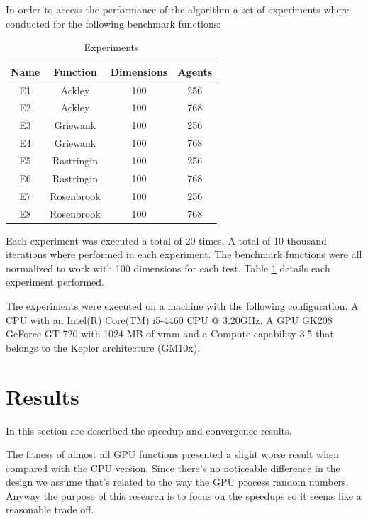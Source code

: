 \documentclass[conference]{IEEEtran}
\begin{document}
In order to access the performance of the algorithm a set of experiments where
conducted for the following benchmark functions:

\begin{table}[H]
    \renewcommand{\arraystretch}{1.3}
    \caption{Experiments}
    \label{list-of-experiments}
    \centering
    \begin{tabular}{c|c|c|c}
    \hline
        \bf Name & Function &  Dimensions & Agents\\
    \hline
        E1 & Ackley & 100 & 256\\
        E2 & Ackley & 100 & 768\\
        E3 & Griewank & 100 & 256\\
        E4 & Griewank & 100 & 768\\
        E5 & Rastringin & 100 & 256\\
        E6 & Rastringin & 100 & 768\\
        E7 & Rosenbrook & 100 & 256\\
        E8 & Rosenbrook & 100 & 768\\
    \end{tabular}
\end{table}

Each experiment was executed a total of 20 times. A total of 10 thousand
iterations where performed in each experiment. The benchmark functions were 
all normalized to work with 100 dimensions for each test. Table \ref{list-of-experiments} 
details each experiment performed.

The experiments were executed on a machine with the following
configuration. A CPU with an Intel(R) Core(TM) i5-4460 CPU @ 3.20GHz. A
GPU GK208 GeForce GT 720 with 1024 MB of vram and a Compute capability
3.5 that belongs to the Kepler architecture (GM10x).



\section{Results} \label{results}%

In this section are described the speedup and convergence results.

The fitness of almost all GPU functions presented a slight worse
result when compared with the CPU version. Since there's no noticeable
difference in the design we assume that's related to the way the GPU
process random numbers. Anyway the purpose of this research is to focus
on the speedups so it seems like a reasonable trade off.
\end{document}
